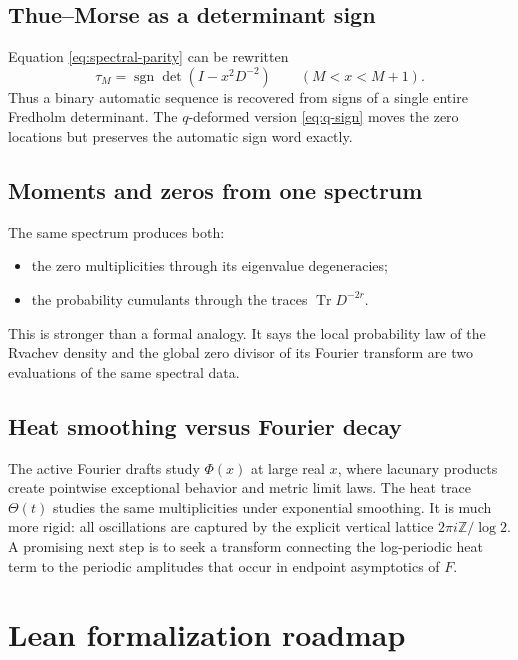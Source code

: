\documentclass[11pt,oneside]{article}
\numberwithin{equation}{section}
\theoremstyle{plain}
\theoremstyle{definition}
\theoremstyle{remark}
\newcommand{\Tr}{\operatorname{Tr}}
\newcommand{\sgn}{\operatorname{sgn}}
\newcommand{\Z}{\mathbb Z}
\newcommand{\tm}{\tau}
\begin{document}
\subsection{Thue--Morse as a determinant sign}

Equation \cref{eq:spectral-parity} can be rewritten
\begin{equation}\label{eq:tm-determinant-sign}
 \tm_M=\sgn\det\!\left(I-x^2D^{-2}\right)
 \qquad(M<x<M+1).
\end{equation}
Thus a binary automatic sequence is recovered from signs of a single entire Fredholm determinant.  The $q$-deformed version \cref{eq:q-sign} moves the zero locations but preserves the automatic sign word exactly.

\subsection{Moments and zeros from one spectrum}

The same spectrum produces both:
\begin{itemize}[leftmargin=2em]
\item the zero multiplicities through its eigenvalue degeneracies;
\item the probability cumulants through the traces $\Tr D^{-2r}$.
\end{itemize}
This is stronger than a formal analogy.  It says the local probability law of the Rvachev density and the global zero divisor of its Fourier transform are two evaluations of the same spectral data.

\subsection{Heat smoothing versus Fourier decay}

The active Fourier drafts study $\Phi(x)$ at large real $x$, where lacunary products create pointwise exceptional behavior and metric limit laws.  The heat trace $\Theta(t)$ studies the same multiplicities under exponential smoothing.  It is much more rigid: all oscillations are captured by the explicit vertical lattice $2\pi i\Z/\log2$.  A promising next step is to seek a transform connecting the log-periodic heat term to the periodic amplitudes that occur in endpoint asymptotics of $F$.

\section{Lean formalization roadmap}
\end{document}
